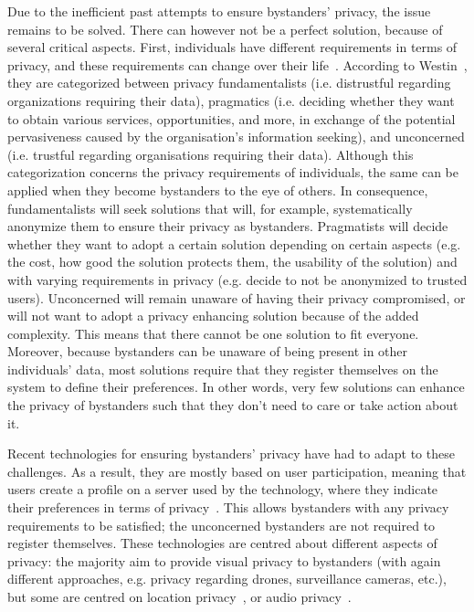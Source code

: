 \documentclass[conference]{IEEEtran}
\begin{document}
Due to the inefficient past attempts to ensure bystanders' privacy, the issue remains to be solved. There can however not be a perfect solution, because of several critical aspects. First, individuals have different requirements in terms of privacy, and these requirements can change over their life~\cite{shu2016cardea}. According to Westin~\cite{langheinrich2009privacy}, they are categorized between privacy fundamentalists (i.e. distrustful regarding organizations requiring their data), pragmatics (i.e. deciding whether they want to obtain various services, opportunities, and more, in exchange of the potential pervasiveness caused by the organisation's information seeking), and unconcerned (i.e. trustful regarding organisations requiring their data). Although this categorization concerns the privacy requirements of individuals, the same can be applied when they become bystanders to the eye of others. In consequence, fundamentalists will seek solutions that will, for example, systematically anonymize them to ensure their privacy as bystanders. Pragmatists will decide whether they want to adopt a certain solution depending on certain aspects (e.g. the cost, how good the solution protects them, the usability of the solution) and with varying requirements in privacy (e.g. decide to not be anonymized to trusted users). Unconcerned will remain unaware of having their privacy compromised, or will not want to adopt a privacy enhancing solution because of the added complexity. This means that there cannot be one solution to fit everyone. Moreover, because bystanders can be unaware of being present in other individuals' data, most solutions require that they register themselves on the system to define their preferences. In other words, very few solutions can enhance the privacy of bystanders such that they don't need to care or take action about it.

Recent technologies for ensuring bystanders' privacy have had to adapt to these challenges. As a result, they are mostly based on user participation, meaning that users create a profile on a server used by the technology, where they indicate their preferences in terms of privacy~\cite{chinomi2008PriSurv, shu2016cardea}. This allows bystanders with any privacy requirements to be satisfied; the unconcerned bystanders are not required to register themselves. These technologies are centred about different aspects of privacy: the majority aim to provide visual privacy to bystanders (with again different approaches, e.g. privacy regarding drones, surveillance cameras, etc.), but some are centred on location privacy~\cite{pidcock2011notisense}, or audio privacy~\cite{larson2011accurate}.
\end{document}
